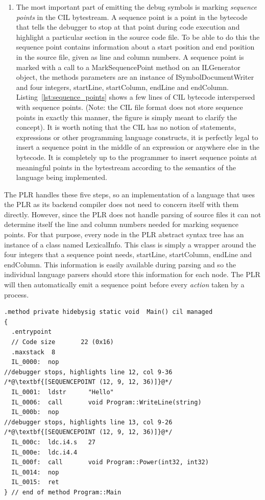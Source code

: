 \begin{enumerate}
		\item The most important part of emitting the debug symbols is marking 
		\textit{sequence points} in the CIL bytestream. A sequence point is a 
		point in the bytecode that tells the debugger to stop at that point during 
		code execution and highlight a particular section in the source code file. 
		To be able to do this the sequence point contains information about a 
		start position and end position in the source file, given as line and 
		column numbers. A sequence point is marked with a call to a 
		\textsf{MarkSequencePoint} method on an \textsf{ILGenerator} object, the 
		methods parameters are an instance of \textsf{ISymbolDocumentWriter} and 
		four integers, startLine, startColumn, endLine and endColumn. 
		Listing~\ref{lst:sequence_points} shows a few lines of CIL bytecode 
		interspersed with sequence points. (Note: the CIL file format does not 
		store sequence points in exactly this manner, the figure is simply meant 
		to clarify the concept). It is worth noting that the CIL has no notion of 
		statements, expressions or other programming language constructs, it is 
		perfectly legal to insert a sequence point in the middle of an expression
		or anywhere else in the bytecode. It is completely up to the programmer to
		insert sequence points at meaningful points in the bytestream according to
		the semantics of the language being implemented.
		
 	\end{enumerate}
 	
 	The PLR handles these five steps, so an implementation of a language that 
 	uses the PLR as its backend compiler does not need to concern itself with 
 	them directly. However, since the PLR does not handle parsing of source 
 	files it can not determine itself the line and column numbers needed for 
 	marking sequence points. For that purpose, every node in the PLR abstract 
 	syntax tree has an instance of a class named \textsf{LexicalInfo}. This 
 	class is simply a wrapper around the four integers that a sequence point 
 	needs, startLine, startColumn, endLine and endColumn. This information is 
 	easily available during parsing and so the individual language parsers 
 	should store this information for each node. The PLR will then automatically 
 	emit a sequence point before every \textit{action} taken by a process.

	\begin{lstlisting}[caption=CIL bytecode with sequence points, label=lst:sequence_points] 
.method private hidebysig static void  Main() cil managed
{
  .entrypoint
  // Code size       22 (0x16)
  .maxstack  8
  IL_0000:  nop
//debugger stops, highlights line 12, col 9-36
/*@\textbf{[SEQUENCEPOINT (12, 9, 12, 36)]}@*/
  IL_0001:  ldstr      "Hello"
  IL_0006:  call       void Program::WriteLine(string)
  IL_000b:  nop
//debugger stops, highlights line 13, col 9-26
/*@\textbf{[SEQUENCEPOINT (12, 9, 12, 36)]}@*/
  IL_000c:  ldc.i4.s   27
  IL_000e:  ldc.i4.4
  IL_000f:  call       void Program::Power(int32, int32)
  IL_0014:  nop
  IL_0015:  ret
} // end of method Program::Main
  \end{lstlisting}

